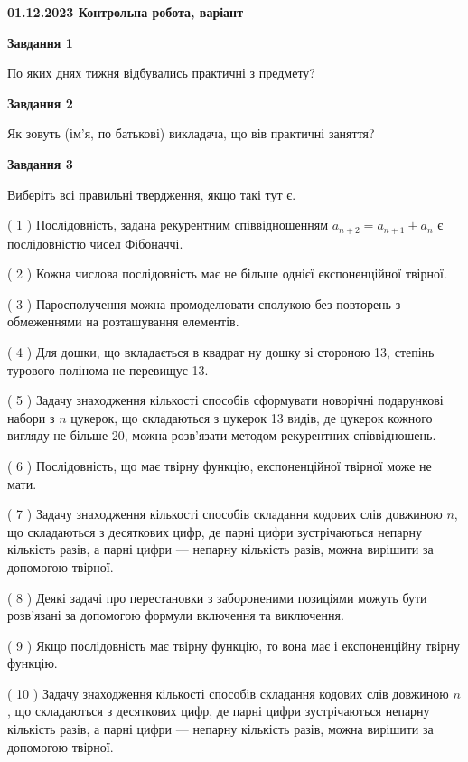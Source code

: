 \documentclass[12pt, ukrainian]{article}
\begin{document}
\begin {large}

\textbf{01.12.2023 Контрольна робота, варіант  }\par


{
{\begin {center}\textbf{Завдання 1}\end {center}}\par
По яких днях тижня відбувались практичні з предмету?\par
{\begin {center}\textbf{Завдання 2}\end {center}}\par
Як зовуть (ім'я, по батькові) викладача, що вів практичні заняття?\par
{\begin {center}\textbf{Завдання 3}\end {center}}\par
Виберіть всі правильні твердження, якщо такі тут є.\par
\vspace{2mm}
( 1 ) Послідовність, задана рекурентним співвідношенням $a_{n+2}=a_{n+1}+a_{n}$ є послідовністю чисел Фібоначчі.%

( 2 ) Кожна числова послідовність має не більше однієї  експоненційної твірної.%

( 3 ) Паросполучення можна промоделювати сполукою без повторень з обмеженнями на розташування елементів.%

( 4 ) Для дошки, що вкладається в квадрат ну дошку зі стороною 13, степінь турового полінома не перевищує 13.%

( 5 ) Задачу знаходження кількості способів сформувати новорічні подарункові набори з $n$ цукерок, що складаються з цукерок 13 видів, де цукерок кожного вигляду не більше 20, можна розв’язати методом рекурентних співвідношень.%

( 6 ) Послідовність, що має твірну функцію, експоненційної твірної може не мати.%

( 7 ) Задачу знаходження кількості способів складання кодових слів довжиною $n$, що складаються з десяткових цифр, де парні цифри зустрічаються непарну кількість разів, а парні цифри — непарну кількість разів, можна вирішити за допомогою твірної.%

( 8 ) Деякі задачі про перестановки з забороненими позиціями можуть бути розв’я\-за\-ні за допомогою формули включення та виключення.%

( 9 ) Якщо послідовність має твірну функцію, то вона має і експоненційну твірну функцію.%

( 10 ) Задачу знаходження кількості способів складання кодових слів довжиною $n$, що складаються з десяткових цифр, де парні цифри зустрічаються непарну кількість разів, а парні цифри — непарну кількість разів, можна вирішити за допомогою твірної.%
}
\end {large}

\vspace{4mm}
\newpage
\end{document}
